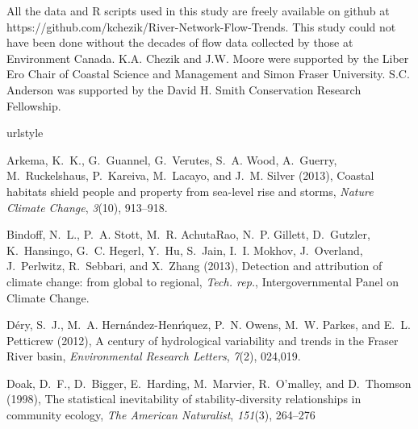 \documentclass[linenumbers,draft]{AGUJournal}
\begin{document}
\acknowledgments
All the data and R scripts used in this study are freely available on github at https://github.com/kchezik/River-Network-Flow-Trends. This study could not have been done without the decades of flow data collected by those at Environment Canada. K.A. Chezik and J.W. Moore were supported by the Liber Ero Chair of Coastal Science and Management and Simon Fraser University. S.C. Anderson was supported by the David H. Smith Conservation Research Fellowship.

\begin{thebibliography}{30}
\providecommand{\natexlab}[1]{#1}
\expandafter\ifx\csname urlstyle\endcsname\relax
  \providecommand{\doi}[1]{doi:\discretionary{}{}{}#1}\else
  \providecommand{\doi}{doi:\discretionary{}{}{}\begingroup
  \urlstyle{rm}\Url}\fi

Arkema, K.~K., G.~Guannel, G.~Verutes, S.~A. Wood, A.~Guerry, M.~Ruckelshaus,
  P.~Kareiva, M.~Lacayo, and J.~M. Silver (2013), Coastal habitats shield
  people and property from sea-level rise and storms, \textit{Nature Climate
  Change}, \textit{3}(10), 913--918.

Bindoff, N.~L., P.~A. Stott, M.~R. AchutaRao, N.~P. Gillett, D.~Gutzler,
  K.~Hansingo, G.~C. Hegerl, Y.~Hu, S.~Jain, I.~I. Mokhov, J.~Overland,
  J.~Perlwitz, R.~Sebbari, and X.~Zhang (2013), Detection and attribution of
  climate change: from global to regional, \textit{Tech. rep.},
  Intergovernmental Panel on Climate Change.

D{\'e}ry, S.~J., M.~A. Hern{\'a}ndez-Henr{\'\i}quez, P.~N. Owens, M.~W. Parkes,
  and E.~L. Petticrew (2012), A century of hydrological variability and trends
  in the {F}raser {R}iver basin, \textit{Environmental Research Letters},
  \textit{7}(2), 024,019.

Doak, D.~F., D.~Bigger, E.~Harding, M.~Marvier, R.~O'malley, and D.~Thomson
  (1998), The statistical inevitability of stability-diversity relationships in
  community ecology, \textit{The American Naturalist}, \textit{151}(3),
  264--276 %


\end{thebibliography}
\end{document}
